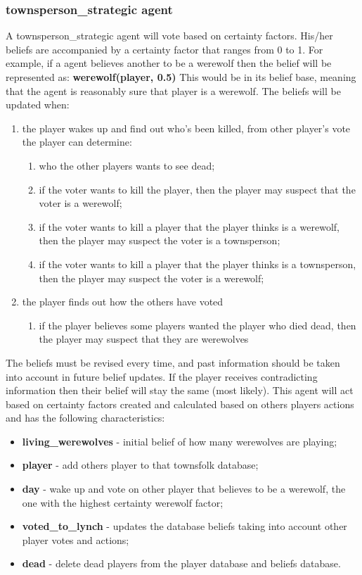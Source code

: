 \documentclass{article}
\begin{document}
\subsubsection{townsperson\_strategic agent}
A townsperson\_strategic agent will vote based on certainty factors. 
His/her beliefs are accompanied by a certainty factor that ranges from 0 to 1. For example, if a agent believes another to be a werewolf then the belief will be represented as: 
\newline
\textbf{werewolf(player, 0.5)} 
\newline
This would be in its belief base, meaning that the agent is reasonably sure that player is a werewolf. The beliefs will be updated when:
\begin{enumerate}
	\item the player wakes up and find out who's been killed, from other player's vote the player can determine:
	\begin {enumerate}
		\item who the other players wants to see dead;
		\item if the voter wants to kill the player, then the player may suspect that the voter is a werewolf;
		\item if the voter wants to kill a player that the player thinks is a werewolf, then the player may suspect the voter is a townsperson;
		\item if the voter wants to kill a player that the player thinks is a townsperson, then the player may suspect the voter is a werewolf;
	\end{enumerate}
	\item the player finds out how the others have voted
	\begin{enumerate}
		\item if the player believes some players wanted the player who died dead, then the player may suspect that they are werewolves
	\end{enumerate}
\end{enumerate}
The beliefs must be revised every time, and past information should be taken into account in future belief updates. If the player receives contradicting information then their belief will stay the same (most likely).
This agent will act based on certainty factors created and calculated based on others players actions and has the following characteristics:
\begin{itemize}
	\item \textbf{living\_werewolves} - initial belief of how many werewolves are playing; 
	\item \textbf{player} - add others player to that townsfolk database;
	\item \textbf{day} - wake up and vote on other player that believes to be a werewolf, the one with the highest certainty werewolf factor;
	\item \textbf{voted\_to\_lynch} - updates the database beliefs taking into account other player votes and actions;
	\item \textbf{dead} - delete dead players from the player database and beliefs database.
\end{itemize}
\end{document}
